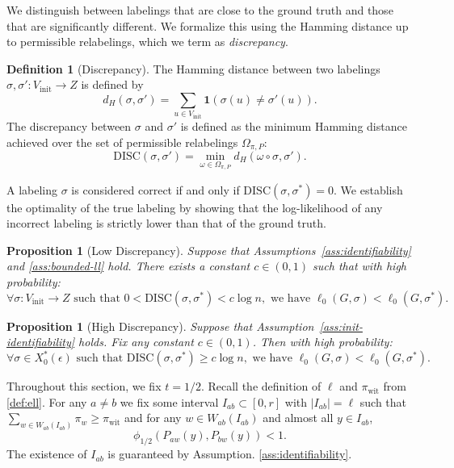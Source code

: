\documentclass[11pt, a4paper]{amsart}
\newcommand{\1}{\mathbf{1}}
\newtheorem{proposition}[theorem]{Proposition}
\theoremstyle{definition}
\newtheorem{definition}[theorem]{Definition}
\theoremstyle{remark}
\theoremstyle{definition}
\begin{document}
We distinguish between labelings that are close to the ground truth and those that are significantly different. We formalize this using the Hamming distance up to permissible relabelings, which we term as \textit{discrepancy}.

\begin{definition}[Discrepancy]
The Hamming distance between two labelings $\sigma, \sigma': {V_{\mathrm{init}}} \to {Z}$ is defined by
\begin{equation}
    d_H(\sigma, \sigma') = \sum_{u \in {V_{\mathrm{init}}}} \1(\sigma(u) \neq \sigma'(u)).
\end{equation}
The discrepancy between $\sigma$ and $\sigma'$ is defined as the minimum Hamming distance achieved over the set of permissible relabelings $\Omega_{\pi,P}$:
\begin{equation}
    \text{DISC}(\sigma, \sigma') = \min_{\omega \in \Omega_{\pi,P}} d_H(\omega \circ \sigma, \sigma').
\end{equation}
\end{definition}

A labeling $\sigma$ is considered correct if and only if $\text{DISC}(\sigma, \sigma^*) = 0$. We establish the optimality of the true labeling by showing that the log-likelihood of any incorrect labeling is strictly lower than that of the ground truth.
\begin{proposition}[Low Discrepancy]
\label{prop: ld}
Suppose that Assumptions~\ref{ass:identifiability} and \ref{ass:bounded-ll} hold. There exists a constant $c \in (0,1)$ such that with high probability:
\[
\forall \sigma: {V_{\mathrm{init}}} \to 
{Z} \text{ such that } 0 < \mathrm{DISC}(\sigma, \sigma^*) < c \log n, \text{ we have } \ell_0({G}, \sigma) < \ell_0({G}, \sigma^*).
\]
\end{proposition}

\begin{proposition}[High Discrepancy]
\label{prop: hd}
Suppose that Assumption~\ref{ass:init-identifiability} holds. 
Fix any constant $c \in (0,1)$. Then with high probability:
\[
\forall \sigma \in X_0^*(\epsilon)\text{ such that } \mathrm{DISC}(\sigma, \sigma^*) \geq c \log n, \text{ we have } \ell_0({G}, \sigma) < \ell_0({G}, \sigma^*).
\]
\end{proposition}

Throughout this section, we fix $t=1/2$. Recall the definition of $\ell$ and $\pi_{\mathrm{wit}}$ from \eqref{def:ell}. For any $a \neq b$ we fix some interval $I_{ab} \subset [0,r]$ with $|I_{ab}| = \ell $ such that $\sum_{w \in W_{ab}(I_{ab})}\pi_w \ge \pi_{\mathrm{wit}}$ and  for any $w \in W_{ab}(I_{ab})$ and almost all $y \in I_{ab}$,
$$
\phi_{1/2}(P_{aw}(y),P_{bw}(y))<1.
$$
The existence of $I_{ab}$ is guaranteed by Assumption. \ref{ass:identifiability}.
\end{document}
